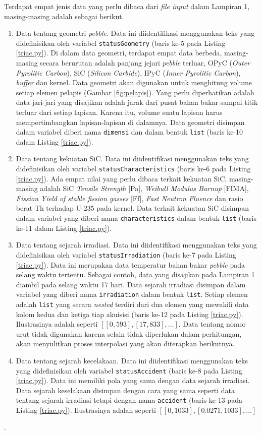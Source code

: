 \documentclass[a4paper,11pt]{report}
\begin{document}
Terdapat empat jenis data yang perlu dibaca dari \textit{file input} dalam Lampiran 1, masing-masing adalah sebagai berikut.
\begin{enumerate}
  \item Data tentang geometri \textit{pebble}. Data ini diidentifikasi menggunakan teks yang didefinisikan oleh variabel \texttt{statusGeometry} (baris ke-5 pada Listing \ref{triac.py}). Di dalam data geometri, terdapat empat data berbeda, masing-masing secara berurutan adalah panjang jejari \textit{pebble} terluar, OPyC (\textit{Outer Pyrolitic Carbon}), SiC (\textit{Silicon Carbide}), IPyC (\textit{Inner Pyrolitic Carbon}), \textit{buffer} dan kernel. Data geometri akan digunakan untuk menghitung volume setiap elemen pelapis (Gambar \ref{fig:pelapis}). Yang perlu diperhatikan adalah data jari-jari yang disajikan adalah jarak dari pusat bahan bakar sampai titik terluar dari setiap lapisan. Karena itu, volume suatu lapisan harus mempertimbangkan lapisan-lapisan di dalamnya. Data geometri disimpan dalam variabel diberi nama \texttt{dimensi} dan dalam bentuk \texttt{list} (baris ke-10 dalam Listing \ref{triac.py}).
  \item Data tentang kekuatan SiC. Data ini diidentifikasi menggunakan teks yang didefinisikan oleh variabel \texttt{statusCharacteristics} (baris ke-6 pada Listing \ref{triac.py}). Ada empat nilai yang perlu dibaca terkait kekuatan SiC, masing-masing adalah SiC \textit{Tensile Strength} [Pa],	\textit{Weibull Modulus	Burnup} [FIMA],	\textit{Fission Yield of stable fission gasses} [Ff],	\textit{Fast Neutron Fluence}	dan rasio berat Th terhadap U-235 pada kernel. Data terkait kekuatan SiC disimpan dalam variabel yang diberi nama \texttt{characteristics} dalam bentuk \texttt{list} (baris ke-11 dalam Listing \ref{triac.py}).
    \item Data tentang sejarah irradiasi. Data ini diidentifikasi menggunakan teks yang didefinisikan oleh variabel \texttt{statusIrradiation} (baris ke-7 pada Listing \ref{triac.py}). Data ini merupakan data temperatur bahan bakar \textit{pebble} pada selang waktu tertentu. Sebagai contoh, data yang disajikan pada Lampiran 1 diambil pada selang waktu 17 hari. Data sejarah irradiasi disimpan dalam variabel yang diberi nama \texttt{irradiation} dalam bentuk \texttt{list}. Setiap elemen adalah \texttt{list} yang secara \textit{nested} terdiri dari dua elemen yang mewakili data kolom kedua dan ketiga tiap akuisisi (baris ke-12 pada Listing \ref{triac.py}). Ilustrasinya adalah seperti $[[0,	593], [17,	833], \ldots]$. Data tentang nomor urut tidak digunakan karena selain tidak diperlukan dalam perhitungan, akan menyulitkan proses interpolasi yang akan diterapkan berikutnya.
    \item Data tentang sejarah kecelakaan. Data ini diidentifikasi menggunakan teks yang didefinisikan oleh variabel \texttt{statusAccident} (baris ke-8 pada Listing \ref{triac.py}). Data ini memiliki pola yang sama dengan data sejarah irradiasi. Data sejarah keselakaan disimpan dengan cara yang sama seperti data tentang sejarah irradiasi tetapi dengan nama \texttt{accident} (baris ke-13 pada Listing \ref{triac.py}). Ilustrasinya adalah seperti $[[0,	1033], [0.0271,	1033],\ldots]$
\end{enumerate}.
 
\end{document}
